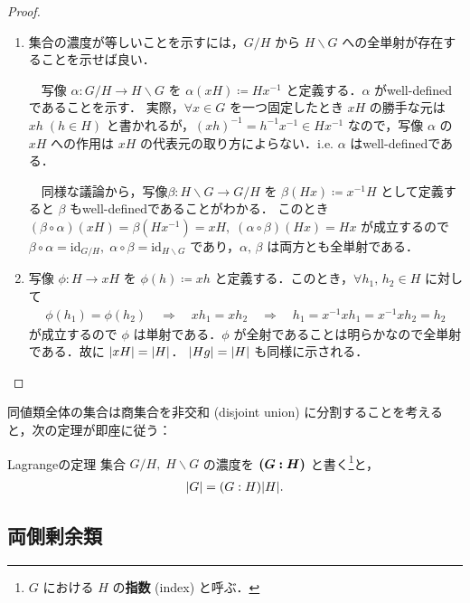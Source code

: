 \documentclass[geometry_main]{subfiles}
\begin{document}
\begin{proof}
	\begin{enumerate}
		\item 集合の濃度が等しいことを示すには，$G/H$ から $H \backslash G$ への全単射が存在することを示せば良い．
		
		　写像 $\alpha \colon G/H \to H \backslash G$ を $\alpha(xH) \coloneqq Hx^{-1}$ と定義する．$\alpha$ がwell-definedであることを示す．
		実際，$\forall x \in G$ を一つ固定したとき $xH$ の勝手な元は $xh\;(h \in H)$ と書かれるが，$(xh)^{-1} = h^{-1} x^{-1} \in Hx^{-1}$ なので，写像 $\alpha$ の $xH$ への作用は $xH$ の代表元の取り方によらない．i.e. $\alpha$ はwell-definedである．

		　同様な議論から，写像$\beta \colon H \backslash G \to G/H$ を $\beta(Hx) \coloneqq x^{-1}H$ として定義すると $\beta$ もwell-definedであることがわかる．
		このとき $(\beta \circ \alpha)(xH) = \beta(Hx^{-1}) = xH,\; (\alpha \circ \beta)(Hx) = Hx$ が成立するので $\beta \circ \alpha = \mathrm{id}_{G/H},\; \alpha \circ \beta = \mathrm{id}_{H \backslash G}$ であり，$\alpha,\, \beta$ は両方とも全単射である．

		\item 写像 $\phi \colon H \to xH$ を $\phi(h) \coloneqq xh$ と定義する．このとき，$\forall h_1,\, h_2 \in H$ に対して 
		\begin{align}
			\phi(h_1) = \phi(h_2) \quad \Longrightarrow \quad xh_1 = xh_2 \quad \Longrightarrow \quad  h_1 = x^{-1}xh_1 = x^{-1}x h_2 = h_2
		\end{align}
		が成立するので $\phi$ は単射である．$\phi$ が全射であることは明らかなので全単射である．故に $\abs{xH} = \abs{H}$．
		$\abs{Hg} = \abs{H}$ も同様に示される．
	\end{enumerate}
\end{proof}

同値類全体の集合は商集合を非交和 (disjoint union) に分割することを考えると，次の定理が即座に従う：

\begin{mytheo}[label=thm.Lagrange]{Lagrangeの定理}
	集合 $G/H,\; H \backslash G$ の濃度を $\vb*{(G : H)}$ と書く\footnote{$G$ における $H$ の\textbf{指数} (index) と呼ぶ．}と，
	\begin{align}
		\abs{G} = (G:H) \abs{H}.
	\end{align}
\end{mytheo}

\subsection{両側剰余類}
\end{document}
